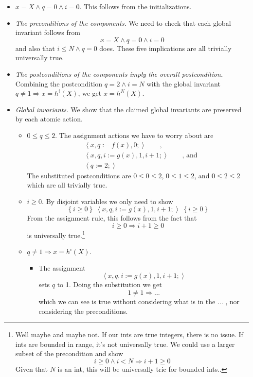 \documentclass[11pt]{article}%
\begin{document}
\begin{itemize}
\item $x=X\wedge q=0\wedge i=0$. This follows from the initializations.

\item \emph{The preconditions of the components. }We need to check that each
global invariant follows from%
\[
x=X\wedge q=0\wedge i=0
\]
and also that $i\leq N\wedge q=0$ does. These five implications are all
trivially universally true.

\item \emph{The postconditions of the components imply the overall
postcondition.} Combining the postcondition $q=2\wedge i=N$ with the global
invariant $q\neq1\Rightarrow x=h^{i}(X)$, we get $x=h^{N}(X)$.

\item \emph{Global invariants.} We show that the claimed global invariants are
preserved by each atomic action.

\begin{itemize}
\item $0\leq q\leq2$. The assignment actions we have to worry about are%
\begin{align*}
&  \left\langle x,q:=f(x),0;\right\rangle \qquad\text{,}\\
&  \left\langle x,q,i:=g(x),1,i+1;\right\rangle \qquad\text{, and}\\
&  \left\langle q:=2;\right\rangle
\end{align*}
The substituted postconditions are $0\leq0\leq2$, $0\leq1\leq2$, and
$0\leq2\leq2$ which are all trivially true.

\item $i\geq0$. By disjoint variables we only need to show%
\[
\left\{  i\geq0\right\}  \;\left\langle x,q,i:=g(x),1,i+1;\right\rangle
\;\left\{  i\geq0\right\}
\]
From the assignment rule, this follows from the fact that%
\[
i\geq0\Rightarrow i+1\geq0
\]
is universally true.\footnote{Well maybe and maybe not. If our \textsf{int}s
are true integers, there is no issue. If ints are bounded in range, it's not
universally true. We could use a larger subset of the precondition and show%
\[
i\geq0\wedge i<N\Rightarrow i+1\geq0
\]
Given that $N$ is an \textsf{int}, this will be universally trie for bounded
\textsf{int}s..}

\item $q\neq1\Rightarrow x=h^{i}(X)$.

\begin{itemize}
\item The assignment%
\[
\left\langle x,q,i:=g(x),1,i+1;\right\rangle
\]
sets $q$ to 1. Doing the substitution we get%
\[
1\neq1\Rightarrow...
\]
which we can see is true without considering what is in the ... , nor
considering the preconditions.


\end{itemize}
\end{itemize}
\end{itemize}
\end{document}
